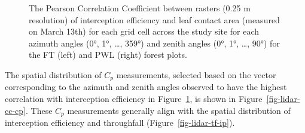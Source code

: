\documentclass[
  letterpaper,
  DIV=11,
  numbers=noendperiod]{scrartcl}
\begin{document}
\begin{figure}[H]


\caption{\label{fig-hemi-ip-cc}The Pearson Correlation Coefficient
between rasters (0.25 m resolution) of interception efficiency and leaf
contact area (measured on March 13th) for each grid cell across the
study site for each azimuth angles (0°, 1°, \ldots, 359°) and zenith
angles (0°, 1°, \ldots, 90°) for the FT (left) and PWL (right) forest
plots.}

\end{figure}%

The spatial distribution of \(C_p\) measurements, selected based on the
vector corresponding to the azimuth and zenith angles observed to have
the highest correlation with interception efficiency in
Figure~\ref{fig-hemi-ip-cc}, is shown in Figure~\ref{fig-lidar-cc-cp}.
These \(C_p\) measurements generally align with the spatial distribution
of interception efficiency and throughfall
(Figure~\ref{fig-lidar-tf-ip}).
\end{document}
